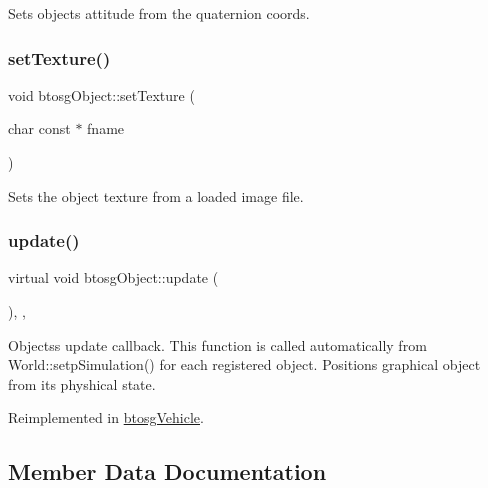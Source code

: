 Sets objects attitude from the quaternion coords. \mbox{\label{classbtosgObject_aff54acbc7c66811efb0cf2838107a241}} 
\subsubsection{\texorpdfstring{set\+Texture()}{setTexture()}}
{\footnotesize\ttfamily void btosg\+Object\+::set\+Texture (\begin{DoxyParamCaption}\item[{char const $\ast$}]{fname }\end{DoxyParamCaption})\hspace{0.3cm}{\ttfamily [inherited]}}

Sets the object texture from a loaded image file. \mbox{\label{classbtosgObject_a342917817dfde62554f83da8e0d5110b}} 
\subsubsection{\texorpdfstring{update()}{update()}}
{\footnotesize\ttfamily virtual void btosg\+Object\+::update (\begin{DoxyParamCaption}{ }\end{DoxyParamCaption})\hspace{0.3cm}{\ttfamily [inline]}, {\ttfamily [virtual]}, {\ttfamily [inherited]}}

Objects\textquotesingle{}s update callback. This function is called automatically from World\+::setp\+Simulation() for each registered object. Positions graphical object from its physhical state. 

Reimplemented in \hyperlink{classbtosgVehicle_a5fd0f471df492ac232c9b772a28bd2b9}{btosg\+Vehicle}.



\subsection{Member Data Documentation}
\mbox{\label{classbtosgObject_a64ccde0543c184ed1749fdb9c9699785}} 
